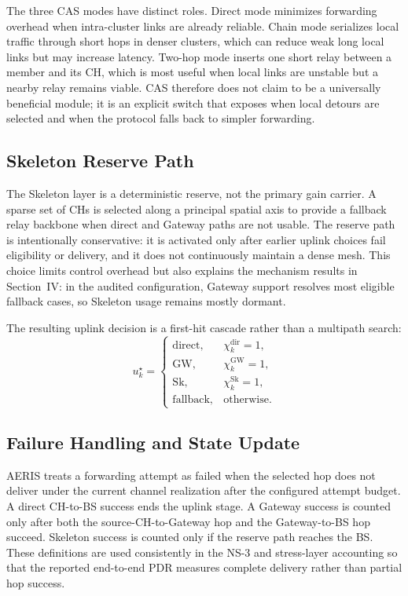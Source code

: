 \documentclass[conference]{IEEEtran}
\begin{document}
The three CAS modes have distinct roles. Direct mode minimizes forwarding overhead when intra-cluster links are already reliable. Chain mode serializes local traffic through short hops in denser clusters, which can reduce weak long local links but may increase latency. Two-hop mode inserts one short relay between a member and its CH, which is most useful when local links are unstable but a nearby relay remains viable. CAS therefore does not claim to be a universally beneficial module; it is an explicit switch that exposes when local detours are selected and when the protocol falls back to simpler forwarding.

\subsection{Skeleton Reserve Path}
The Skeleton layer is a deterministic reserve, not the primary gain carrier. A sparse set of CHs is selected along a principal spatial axis to provide a fallback relay backbone when direct and Gateway paths are not usable. The reserve path is intentionally conservative: it is activated only after earlier uplink choices fail eligibility or delivery, and it does not continuously maintain a dense mesh. This choice limits control overhead but also explains the mechanism results in Section~IV: in the audited configuration, Gateway support resolves most eligible fallback cases, so Skeleton usage remains mostly dormant.

The resulting uplink decision is a first-hit cascade rather than a multipath search:
\begin{equation}
u_k^\star=\begin{cases}
\mathrm{direct}, & \chi_k^{\mathrm{dir}}=1,\\
\mathrm{GW}, & \chi_k^{\mathrm{GW}}=1,\\
\mathrm{Sk}, & \chi_k^{\mathrm{Sk}}=1,\\
\mathrm{fallback}, & \text{otherwise}.
\end{cases}
\end{equation}

\subsection{Failure Handling and State Update}
AERIS treats a forwarding attempt as failed when the selected hop does not deliver under the current channel realization after the configured attempt budget. A direct CH-to-BS success ends the uplink stage. A Gateway success is counted only after both the source-CH-to-Gateway hop and the Gateway-to-BS hop succeed. Skeleton success is counted only if the reserve path reaches the BS. These definitions are used consistently in the NS-3 and stress-layer accounting so that the reported end-to-end PDR measures complete delivery rather than partial hop success.
\end{document}
